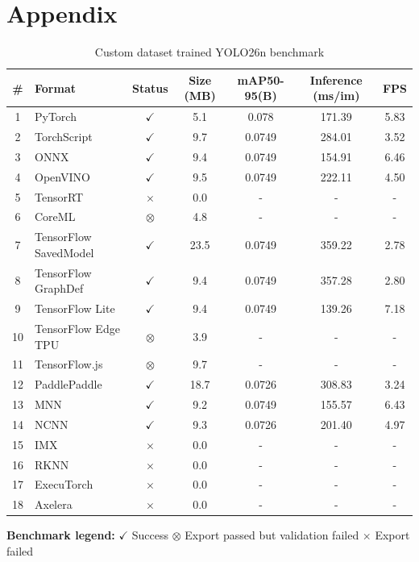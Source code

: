 ﻿\clearpage
\onecolumn

\section{Appendix}\label{appendix:benchmark}

\begin{table}[h] %
	\begin{tabular}{clccccc}
		\toprule
		\# & Format & Status & Size (MB) & mAP50-95(B) & Inference (ms/im) & FPS \\
		\midrule
		1  & PyTorch               & $\checkmark$ & 5.1  & 0.078  & 171.39 & 5.83 \\
		2  & TorchScript           & $\checkmark$ & 9.7  & 0.0749 & 284.01 & 3.52 \\
		3  & ONNX                  & $\checkmark$ & 9.4  & 0.0749 & 154.91 & 6.46 \\
		4  & OpenVINO              & $\checkmark$ & 9.5  & 0.0749 & 222.11 & 4.50 \\
		5  & TensorRT              & $\times$     & 0.0  & -      & -      & -    \\
		6  & CoreML                & $\otimes$    & 4.8  & -      & -      & -    \\
		7  & TensorFlow SavedModel & $\checkmark$ & 23.5 & 0.0749 & 359.22 & 2.78 \\
		8  & TensorFlow GraphDef   & $\checkmark$ & 9.4  & 0.0749 & 357.28 & 2.80 \\
		9  & TensorFlow Lite       & $\checkmark$ & 9.4  & 0.0749 & 139.26 & 7.18 \\
		10 & TensorFlow Edge TPU   & $\otimes$    & 3.9  & -      & -      & -    \\
		11 & TensorFlow.js         & $\otimes$    & 9.7  & -      & -      & -    \\
		12 & PaddlePaddle          & $\checkmark$ & 18.7 & 0.0726 & 308.83 & 3.24 \\
		13 & MNN                   & $\checkmark$ & 9.2  & 0.0749 & 155.57 & 6.43 \\
		14 & NCNN                  & $\checkmark$ & 9.3  & 0.0726 & 201.40 & 4.97 \\
		15 & IMX                   & $\times$     & 0.0  & -      & -      & -    \\
		16 & RKNN                  & $\times$     & 0.0  & -      & -      & -    \\
		17 & ExecuTorch            & $\times$     & 0.0  & -      & -      & -    \\
		18 & Axelera               & $\times$     & 0.0  & -      & -      & -    \\
		\bottomrule
	\end{tabular}
	
	\vspace{2mm}
	\footnotesize
	\textbf{Benchmark legend:} 
		$\checkmark$ Success \quad
		$\otimes$ Export passed but validation failed \quad
		$\times$ Export failed
	\caption{Custom dataset trained YOLO26n benchmark}
	
	\label{table:results}
\end{table}

